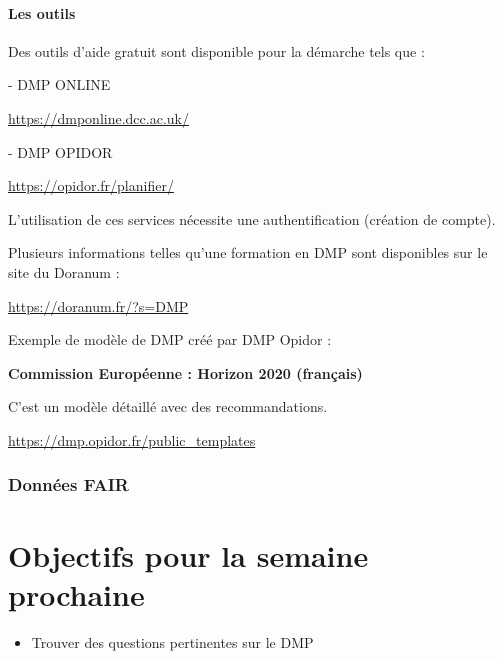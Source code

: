 \documentclass[11pt,oneside]{article}
\begin{document}
\subsection*{Les outils}

\begin{flushleft}
Des outils d’aide gratuit sont disponible pour la démarche tels que :
\end{flushleft}

-	DMP ONLINE

\begin{flushleft}
\url{https://dmponline.dcc.ac.uk/}
\end{flushleft}

-	DMP OPIDOR

\begin{flushleft}
\url{https://opidor.fr/planifier/}
\end{flushleft}

\begin{flushleft}
L’utilisation de ces services nécessite une authentification (création de compte).
\end{flushleft}

\begin{flushleft}
Plusieurs informations telles qu’une formation en DMP sont disponibles sur le site du Doranum :
\end{flushleft}

\begin{flushleft}
\url{https://doranum.fr/?s=DMP}
\end{flushleft}

\newpage

\begin{flushleft}
Exemple de modèle de DMP créé par DMP Opidor :
\end{flushleft}

\begin{flushleft}
\textbf{Commission Européenne : Horizon 2020 (français)}
\end{flushleft}

\begin{flushleft}
C’est un modèle détaillé avec des recommandations.
\end{flushleft}

\begin{flushleft}
\url{https://dmp.opidor.fr/public_templates}
\end{flushleft}

\section*{Données FAIR}

\newpage
\part*{Objectifs pour la semaine prochaine}
\begin{itemize}
	\item Trouver des questions pertinentes sur le DMP
\end{itemize}
\end{document}

